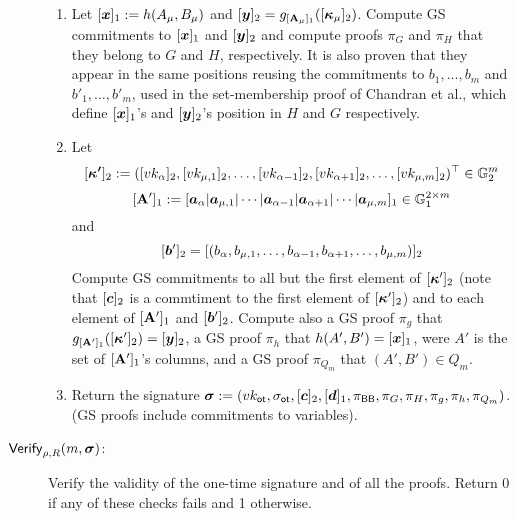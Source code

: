 \begin{description}
\begin{enumerate}
\item Let $[{\boldsymbol{x}}]_1:=h(A_\mu,B_\mu)$ and $[{\boldsymbol{y}}]_2=g_{[\mathbf{{A}}_\mu]_1}([{\boldsymbol{\kappa}}_\mu]_2)$. Compute GS commitments to $[{\boldsymbol{x}}]_1$ and $[{\boldsymbol{y}}]_2$ and compute proofs $\pi_G$ and $\pi_H$ that they belong to $G$ and $H$, respectively. It is also proven that they appear in the same positions reusing the commitments to $b_1,\ldots,b_{m}$ and $b'_1,\ldots,b'_{m}$, used in the set-membership proof of Chandran et al., which define $[{\boldsymbol{x}}]_1$'s and $[{\boldsymbol{y}}]_2$'s position in $H$ and $G$ respectively.

\item Let
$$[{\boldsymbol{\kappa'}}]_2:=([vk_\alpha]_2,[vk_{\mu,1}]_2,\ldots,[vk_{\alpha-1}]_2,[vk_{\alpha+1}]_2,\ldots,[vk_{\mu,m}]_2)^\top\in\mathbb{G}_2^m$$
$$[\mathbf{{A}}']_1:=[{\boldsymbol{a}}_\alpha | {\boldsymbol{a}}_{\mu,1} | \cdots | {\boldsymbol{a}}_{\alpha-1}| {\boldsymbol{a}}_{\alpha+1}|\cdots|{\boldsymbol{a}}_{\mu,m}]_1\in\mathbb{G}_1^{2\times m}$$
and
$$
[{\boldsymbol{b}}']_2 = [(b_\alpha, b_{\mu,1},\ldots,b_{\alpha-1},b_{\alpha+1},\ldots,b_{\mu,m})]_2
$$
Compute GS commitments to all but the first element of $[{\boldsymbol{\kappa}}']_2$ (note that $[{\boldsymbol{c}}]_2$ is a commtiment to the first element of $[{\boldsymbol{\kappa}}']_2$) and to each element of $[\mathbf{{A}}']_1$ and $[{\boldsymbol{b}}']_2$. Compute also a GS proof $\pi_g$ that $g_{[\mathbf{{A}}']_1}([{\boldsymbol{\kappa}}']_2)=[{\boldsymbol{y}}]_2$, a GS proof $\pi_{h}$ that $h(A',B')=[{\boldsymbol{x}}]_1$, were $A'$ is the set of $[\mathbf{{A}}']_1$'s columns, and a GS proof $\pi_{Q_m}$ that $(A',B')\in Q_m$.

\item Return the signature ${\boldsymbol \sigma}:=(vk_\mathsf{ot},\sigma_\mathsf{ot},[{\boldsymbol{c}}]_2,[{\boldsymbol{d}}]_1,\pi_{\mathsf{BB}},\pi_G,\pi_H, \pi_g,\pi_h,\pi_{Q_m})$. (GS proofs include commitments to variables).
\end{enumerate}

\item[$\mathsf{Verify}_{\rho,R}(m,{\boldsymbol \sigma})$:] Verify the validity of the one-time signature and of all the proofs. Return 0 if any of these checks fails and 1 otherwise.
\end{description}

